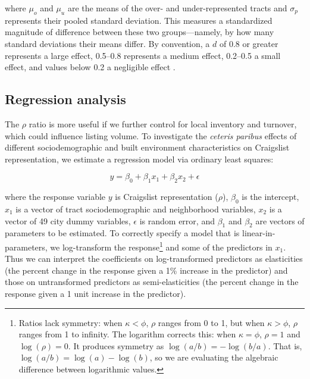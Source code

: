 \documentclass[11pt,onecolumn]{article} %
\begin{document}
where $\mu_o$ and $\mu_u$ are the means of the over- and under-represented tracts and $\sigma_p$ represents their pooled standard deviation. This measures a standardized magnitude of difference between these two groups---namely, by how many standard deviations their means differ. By convention, a $d$ of 0.8 or greater represents a large effect, 0.5--0.8 represents a medium effect, 0.2--0.5 a small effect, and values below 0.2 a negligible effect \citep{cohen_power_1992}.





\subsection{Regression analysis}

The $\rho$ ratio is more useful if we further control for local inventory and turnover, which could influence listing volume. To investigate the \textit{ceteris paribus} effects of different sociodemographic and built environment characteristics on Craigslist representation, we estimate a regression model via ordinary least squares:

\begin{equation}
	\label{eq:regression_formula}
	y = \beta_0 + \beta_1 x_1 + \beta_2 x_2 + \epsilon
\end{equation}

where the response variable $y$ is Craigslist representation ($\rho$), $\beta_0$ is the intercept, $x_1$ is a vector of tract sociodemographic and neighborhood variables, $x_2$ is a vector of 49 city dummy variables, $\epsilon$ is random error, and $\beta_1$ and $\beta_2$ are vectors of parameters to be estimated. To correctly specify a model that is linear-in-parameters, we log-transform the response\footnote{Ratios lack symmetry: when $\kappa < \phi$, $\rho$ ranges from 0 to 1, but when  $\kappa > \phi$, $\rho$ ranges from 1 to infinity. The logarithm corrects this: when $\kappa = \phi$, $\rho = 1$ and $\log(\rho) = 0$. It produces symmetry as $\log(a/b) = -\log(b/a)$. That is, $\log(a/b) = \log(a)-\log(b)$, so we are evaluating the algebraic difference between logarithmic values.} and some of the predictors in $x_1$. Thus we can interpret the coefficients on log-transformed predictors as elasticities (the percent change in the response given a 1\% increase in the predictor) and those on untransformed predictors as semi-elasticities (the percent change in the response given a 1 unit increase in the predictor).
\end{document}
